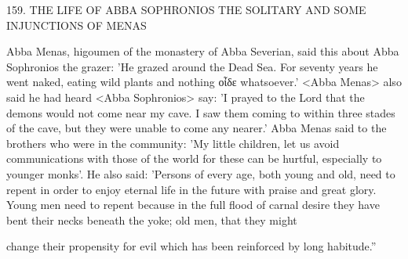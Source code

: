159.
THE LIFE OF ABBA SOPHRONIOS
THE SOLITARY AND SOME INJUNCTIONS OF MENAS

Abba Menas, higoumen of the monastery of Abba Severian, said
this about Abba Sophronios the grazer: 'He grazed around the
Dead Sea.
For seventy years he went naked, eating wild plants and
nothing οἶδε whatsoever.' <Abba Menas> also said he had heard
<Abba Sophronios> say: 'I prayed to the Lord that the demons
would not come near my cave.
I saw them coming to within three
stades of the cave, but they were unable to come any nearer.' Abba
Menas said to the brothers who were in the community: 'My little
children, let us avoid communications with those of the world for
these can be hurtful, especially to younger monks'.
He also said:
'Persons of every age, both young and old, need to repent in order
to enjoy eternal life in the future with praise and great glory.
Young
men need to repent because in the full flood of carnal desire they
have bent their necks beneath the yoke; old men, that they might

change their propensity for evil which has been reinforced by long
habitude.”

